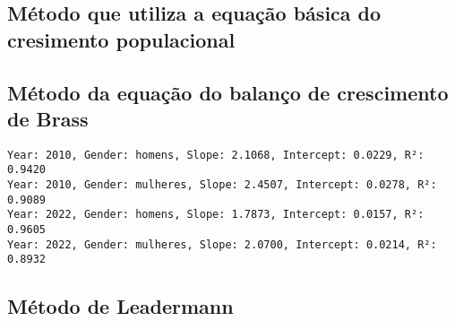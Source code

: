 \documentclass[
  12pt,
  a4paper,
]{scrreprt}
\begin{document}
\subsection{Método que utiliza a equação básica do cresimento
populacional}\label{muxe9todo-que-utiliza-a-equauxe7uxe3o-buxe1sica-do-cresimento-populacional}

\subsection{Método da equação do balanço de crescimento de
Brass}\label{muxe9todo-da-equauxe7uxe3o-do-balanuxe7o-de-crescimento-de-brass-1}

\begin{verbatim}
Year: 2010, Gender: homens, Slope: 2.1068, Intercept: 0.0229, R²: 0.9420
Year: 2010, Gender: mulheres, Slope: 2.4507, Intercept: 0.0278, R²: 0.9089
Year: 2022, Gender: homens, Slope: 1.7873, Intercept: 0.0157, R²: 0.9605
Year: 2022, Gender: mulheres, Slope: 2.0700, Intercept: 0.0214, R²: 0.8932
\end{verbatim}

\subsection{Método de Leadermann}\label{muxe9todo-de-leadermann}
\end{document}
